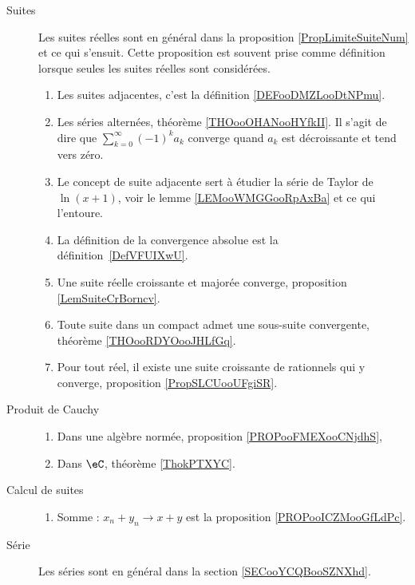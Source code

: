 

\begin{description}
	\item[Suites]
	      Les suites réelles sont en général dans la proposition \ref{PropLimiteSuiteNum} et ce qui s'ensuit. Cette proposition est souvent prise comme définition lorsque seules les suites réelles sont considérées.
	      \begin{enumerate}
		      \item
		            Les suites adjacentes, c'est la définition \ref{DEFooDMZLooDtNPmu}.
		      \item
		            Les séries alternées, théorème \ref{THOooOHANooHYfkII}. Il s'agit de dire que \( \sum_{k=0}^{\infty}(-1)^ka_k\) converge quand \( a_k\) est décroissante et tend vers zéro.
		      \item
		            Le concept de suite adjacente sert à étudier la série de Taylor de \( \ln(x+1)\), voir le lemme \ref{LEMooWMGGooRpAxBa} et ce qui l'entoure.
		      \item
		            La définition de la convergence absolue est la définition~\ref{DefVFUIXwU}.
		      \item
		            Une suite réelle croissante et majorée converge, proposition \ref{LemSuiteCrBorncv}.
		      \item
		            Toute suite dans un compact admet une sous-suite convergente, théorème \ref{THOooRDYOooJHLfGq}.
		      \item
		            Pour tout réel, il existe une suite croissante de rationnels qui y converge, proposition \ref{PropSLCUooUFgiSR}.
	      \end{enumerate}
	\item[Produit de Cauchy]
	      \begin{enumerate}
		      \item
		            Dans une algèbre normée, proposition \ref{PROPooFMEXooCNjdhS},
		      \item
		            Dans \( \eC\), théorème \ref{ThokPTXYC}.
	      \end{enumerate}
	\item[Calcul de suites]
	      \begin{enumerate}
		      \item
		            Somme : \( x_n+y_n\to x+y\) est la proposition \ref{PROPooICZMooGfLdPc}.
	      \end{enumerate}
	\item[Série]
	      Les séries sont en général dans la section \ref{SECooYCQBooSZNXhd}.

\end{description}
